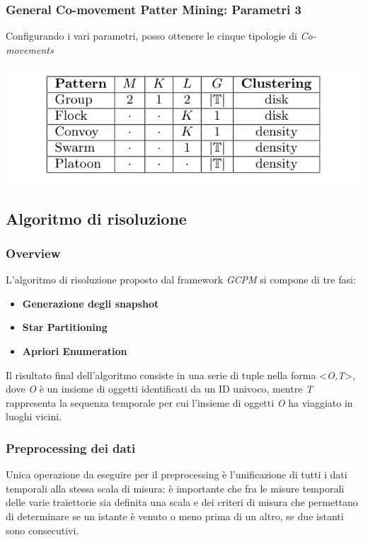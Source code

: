 \documentclass{beamer}
\begin{document}
\begin{frame}
\frametitle{General Co-movement Patter Mining: Parametri 3}

Configurando i vari parametri, posso ottenere le cinque tipologie di \textit{Co-movements}

\begin{center}
\includegraphics[scale=0.4]{ParametersConfiguration} 
\end{center}

\end{frame}



\subsection{Algoritmo di risoluzione}

\begin{frame}
	
	\frametitle{Overview}
	
	L'algoritmo di risoluzione proposto dal framework \textit{GCPM} si compone di tre fasi:
	
	\begin{itemize}
		
		\item \textbf{Generazione degli snapshot}
		
		\item \textbf{Star Partitioning}
		
		\item \textbf{Apriori Enumeration}
	\end{itemize}

Il risultato final dell'algoritmo consiste in una serie di tuple nella forma  \textless \textit{O,T}\textgreater,  dove \textit{O} è un insieme di oggetti identificati da un ID univoco, 
mentre \textit{T} rappresenta la sequenza temporale per cui l'insieme di oggetti \textit{O} ha viaggiato in luoghi vicini.
	
\end{frame}	

\begin{frame}
	\frametitle{Preprocessing dei dati}
	Unica operazione da eseguire per il preprocessing è l'unificazione di tutti i dati temporali alla stessa scala di misura:
	è importante che fra le misure temporali delle varie traiettorie sia definita una scala e dei criteri di misura che permettano di determinare se un istante è venuto o meno prima di un altro, 
	se due istanti sono consecutivi.
\end{frame}
\end{document}
